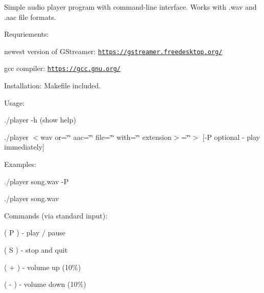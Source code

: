 Simple audio player program with command-\/line interface. Works with .wav and .aac file formats.

Requriements\+:
\begin{DoxyItemize}
\item newest version of G\+Streamer\+: \href{https://gstreamer.freedesktop.org/}{\tt https\+://gstreamer.\+freedesktop.\+org/}
\item gcc compiler\+: \href{https://gcc.gnu.org/}{\tt https\+://gcc.\+gnu.\+org/}
\end{DoxyItemize}

Installation\+: Makefile included.

Usage\+:
\begin{DoxyItemize}
\item ./player -\/h (show help)
\item ./player $<$wav or=\char`\"{}\char`\"{} aac=\char`\"{}\char`\"{} file=\char`\"{}\char`\"{} with=\char`\"{}\char`\"{} extension$>$=\char`\"{}\char`\"{}$>$ \mbox{[}-\/P optional -\/ play immediately\mbox{]}
\end{DoxyItemize}

Examples\+:
\begin{DoxyItemize}
\item ./player song.\+wav -\/P
\item ./player song.\+wav
\end{DoxyItemize}

Commands (via standard input)\+:
\begin{DoxyItemize}
\item ( P ) -\/ play / pause
\item ( S ) -\/ stop and quit
\item ( + ) -\/ volume up (10\%)
\item ( -\/ ) -\/ volume down (10\%) 
\end{DoxyItemize}